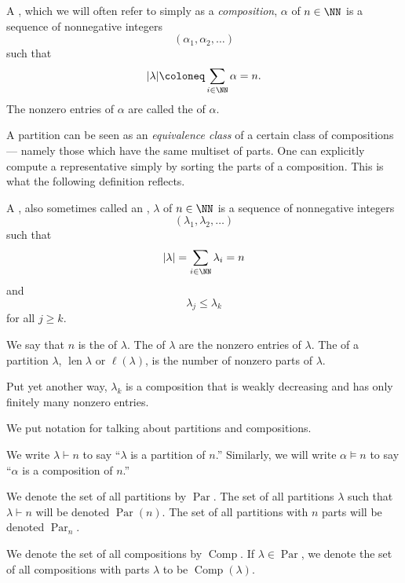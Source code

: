 \documentclass{article}
\DeclareMathOperator{\len}{len}
\DeclareMathOperator{\Par}{Par}
\DeclareMathOperator{\Com}{Comp}
\begin{document}
\begin{definition}
    A , which we will often refer to simply as a \textit{composition}, $\alpha$ of $n \in \NN$ is a sequence of nonnegative integers 
    \[
        (\alpha_1,\alpha_2,\ldots)
    \]
    such that 
    \[
        |\lambda|
        \coloneq
        \sum_{i\in\NN}\alpha
        =
        n.
    \]
    The nonzero entries of $\alpha$ are called the  of $\alpha$.
\end{definition}

A partition can be seen as an \textit{equivalence class} of a certain class of compositions--- namely those which have the same multiset of parts.
One can explicitly compute a representative simply by sorting the parts of a composition.
This is what the following definition reflects.

\begin{definition}
    A , also sometimes called an , $\lambda$ of $n \in \NN$ is a sequence of nonnegative integers 
    \[
        (\lambda_1,\lambda_2,\ldots)
    \]
    such that 
    \[
        |\lambda| = \sum_{i\in\NN}\lambda_i = n
    \]
    and 
    \[
        \lambda_j \leq \lambda_k
    \]
    for all $j\geq k$.

    We say that $n$ is the  of $\lambda$.
    The  of $\lambda$ are the nonzero entries of $\lambda$.
    The  of a partition $\lambda$, $\len \lambda$ or $\ell(\lambda)$, is the number of nonzero parts of $\lambda$.
\end{definition}

Put yet another way, $\lambda_k$ is a composition that is weakly decreasing and has only finitely many nonzero entries.

We put notation for talking about partitions and compositions.

\begin{convention}
    We write $\lambda \vdash n$ to say ``$\lambda$ is a partition of $n$.''
    Similarly, we will write $\alpha \models n$ to say ``$\alpha$ is a composition of $n$.''

    We denote the set of all partitions by $\Par$.
    The set of all partitions $\lambda$ such that $\lambda \vdash n$ will be denoted $\Par(n)$.
    The set of all partitions with $n$ parts will be denoted $\Par_{n}$.

    We denote the set of all compositions by $\Com$.
    If $\lambda \in \Par$, we denote the set of all compositions with parts $\lambda$ to be $\Com(\lambda)$.

\end{convention}
\end{document}
